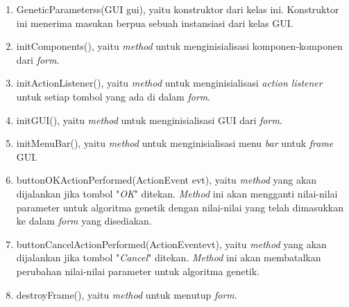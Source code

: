 \begin{enumerate}
\item GeneticParameterss(GUI gui), yaitu konstruktor dari kelas ini. Konstruktor ini menerima masukan berpua sebuah instansiasi dari kelas GUI.
\item initComponents(), yaitu \textit{method} untuk menginisialisasi komponen-komponen dari \textit{form}.
\item initActionListener(), yaitu \textit{method} untuk menginisialisasi \textit{action listener} untuk setiap tombol yang ada di dalam \textit{form}.
\item initGUI(), yaitu \textit{method} untuk menginisialisasi GUI dari \textit{form}.
\item initMenuBar(), yaitu \textit{method} untuk menginisialisasi menu \textit{bar} untuk \textit{frame} GUI.
\item buttonOKActionPerformed(ActionEvent evt), yaitu \textit{method} yang akan dijalankan jika tombol "\textit{OK}" ditekan. \textit{Method} ini akan mengganti nilai-nilai parameter untuk algoritma genetik dengan nilai-nilai yang telah dimasukkan ke dalam \textit{form} yang disediakan.
\item buttonCancelActionPerformed(ActionEventevt), yaitu \textit{method} yang akan dijalankan jika tombol "\textit{Cancel}" ditekan. \textit{Method} ini akan membatalkan perubahan nilai-nilai parameter untuk algoritma genetik.
\item destroyFrame(), yaitu \textit{method} untuk menutup \textit{form}.
\end{enumerate}